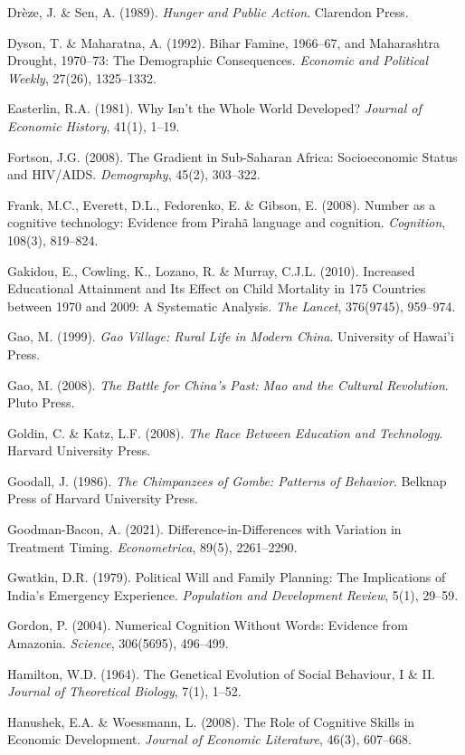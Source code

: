\documentclass[12pt,letterpaper]{article}
\begin{document}
Drèze, J. \& Sen, A. (1989). \emph{Hunger and Public Action}. Clarendon
Press.

Dyson, T. \& Maharatna, A. (1992). Bihar Famine, 1966--67, and
Maharashtra Drought, 1970--73: The Demographic Consequences.
\emph{Economic and Political Weekly}, 27(26), 1325--1332.

Easterlin, R.A. (1981). Why Isn't the Whole World Developed?
\emph{Journal of Economic History}, 41(1), 1--19.

Fortson, J.G. (2008). The Gradient in Sub-Saharan Africa: Socioeconomic
Status and HIV/AIDS. \emph{Demography}, 45(2), 303--322.

Frank, M.C., Everett, D.L., Fedorenko, E. \& Gibson, E. (2008). Number
as a cognitive technology: Evidence from Pirahã language and cognition.
\emph{Cognition}, 108(3), 819--824.

Gakidou, E., Cowling, K., Lozano, R. \& Murray, C.J.L. (2010).
Increased Educational Attainment and Its Effect on Child Mortality in
175 Countries between 1970 and 2009: A Systematic Analysis.
\emph{The Lancet}, 376(9745), 959--974.

Gao, M. (1999). \emph{Gao Village: Rural Life in Modern China}.
University of Hawai'i Press.

Gao, M. (2008). \emph{The Battle for China's Past: Mao and the Cultural
Revolution}. Pluto Press.

Goldin, C. \& Katz, L.F. (2008). \emph{The Race Between Education and
Technology}. Harvard University Press.

Goodall, J. (1986). \emph{The Chimpanzees of Gombe: Patterns of
Behavior}. Belknap Press of Harvard University Press.

Goodman-Bacon, A. (2021). Difference-in-Differences with Variation in
Treatment Timing. \emph{Econometrica}, 89(5), 2261--2290.

Gwatkin, D.R. (1979). Political Will and Family Planning: The
Implications of India's Emergency Experience. \emph{Population and
Development Review}, 5(1), 29--59.

Gordon, P. (2004). Numerical Cognition Without Words: Evidence from
Amazonia. \emph{Science}, 306(5695), 496--499.

Hamilton, W.D. (1964). The Genetical Evolution of Social Behaviour, I
\& II. \emph{Journal of Theoretical Biology}, 7(1), 1--52.

Hanushek, E.A. \& Woessmann, L. (2008). The Role of Cognitive Skills in
Economic Development. \emph{Journal of Economic Literature}, 46(3),
607--668.
\end{document}
